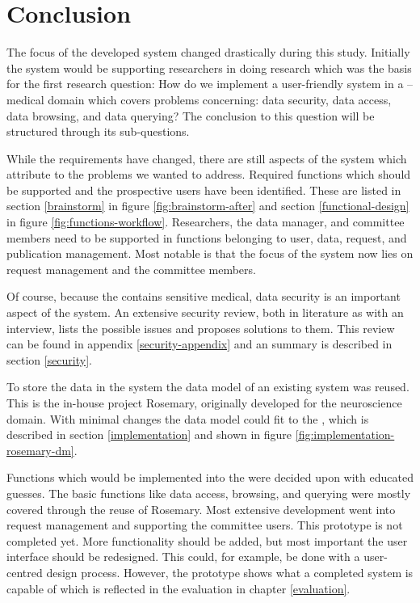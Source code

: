 \section{Conclusion}

The focus of the developed system changed drastically during this study.
Initially the system would be supporting researchers in doing research which was the basis for the first research question:
How do we implement a user-friendly system in a \IVF{}--\PRN{} medical domain which covers problems concerning: data security, data access, data browsing, and data querying?
The conclusion to this question will be structured through its sub-questions.

While the requirements have changed, there are still aspects of the system which attribute to the problems we wanted to address.
Required functions which should be supported and the prospective users have been identified.
These are listed in section \ref{brainstorm} in figure \ref{fig:brainstorm-after} and section \ref{functional-design} in figure \ref{fig:functions-workflow}.
Researchers, the data manager, and committee members need to be supported in functions belonging to user, data, request, and publication management.
Most notable is that the focus of the system now lies on request management and the committee members.

Of course, because the \projectdata{} contains sensitive medical, data security is an important aspect of the system.
An extensive security review, both in literature as with an interview, lists the possible issues and proposes solutions to them.
This review can be found in appendix \ref{security-appendix} and an summary is described in section \ref{security}.

To store the data in the system the data model of an existing system was reused.
This is the in-house project Rosemary, originally   developed for the neuroscience domain.
With minimal changes the data model could fit to the \projectdata{}, which is described in section \ref{implementation} and shown in figure \ref{fig:implementation-rosemary-dm}.

Functions which would be implemented into the \ivfprototype{} were decided upon with educated guesses.
The basic functions like data access, browsing, and querying were mostly covered through the reuse of Rosemary.
Most extensive development went into request management and supporting the committee users.
This prototype is not completed yet.
More functionality should be added, but most important the user interface should be redesigned.
This could, for example, be done with a user-centred design process.
However, the prototype shows what a completed system is capable of which is reflected in the evaluation in chapter \ref{evaluation}.

